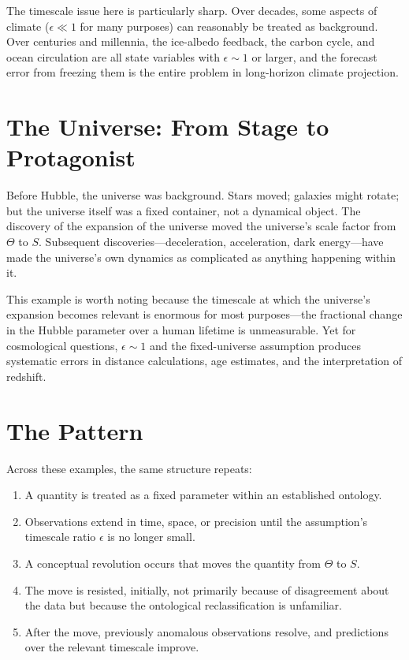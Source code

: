 \documentclass[11pt]{book}
\theoremstyle{plain}
\theoremstyle{definition}
\theoremstyle{remark}
\begin{document}
The timescale issue here is particularly sharp. Over decades, some aspects of climate ($\epsilon \ll 1$ for many purposes) can reasonably be treated as background. Over centuries and millennia, the ice-albedo feedback, the carbon cycle, and ocean circulation are all state variables with $\epsilon \sim 1$ or larger, and the forecast error from freezing them is the entire problem in long-horizon climate projection.

\section{The Universe: From Stage to Protagonist}

Before Hubble, the universe was background. Stars moved; galaxies might rotate; but the universe itself was a fixed container, not a dynamical object. The discovery of the expansion of the universe moved the universe's scale factor from $\Theta$ to $S$. Subsequent discoveries---deceleration, acceleration, dark energy---have made the universe's own dynamics as complicated as anything happening within it.

This example is worth noting because the timescale at which the universe's expansion becomes relevant is enormous for most purposes---the fractional change in the Hubble parameter over a human lifetime is unmeasurable. Yet for cosmological questions, $\epsilon \sim 1$ and the fixed-universe assumption produces systematic errors in distance calculations, age estimates, and the interpretation of redshift.

\section{The Pattern}

Across these examples, the same structure repeats:

\begin{enumerate}[label=\arabic*.,itemsep=3pt]
\item A quantity is treated as a fixed parameter within an established ontology.
\item Observations extend in time, space, or precision until the assumption's timescale ratio $\epsilon$ is no longer small.
\item A conceptual revolution occurs that moves the quantity from $\Theta$ to $S$.
\item The move is resisted, initially, not primarily because of disagreement about the data but because the ontological reclassification is unfamiliar.
\item After the move, previously anomalous observations resolve, and predictions over the relevant timescale improve.
\end{enumerate}
\end{document}

